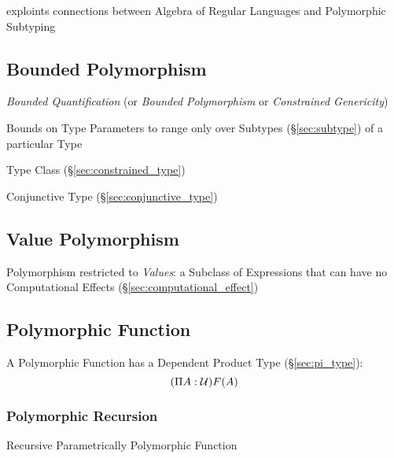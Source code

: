 exploints connections between Algebra of Regular Languages and
Polymorphic Subtyping



\subsection{Bounded Polymorphism}\label{sec:bounded_polymorphism}

\emph{Bounded Quantification} (or \emph{Bounded Polymorphism} or
\emph{Constrained Genericity})

Bounds on Type Parameters to range only over Subtypes
(\S\ref{sec:subtype}) of a particular Type

Type Class (\S\ref{sec:constrained_type})

Conjunctive Type (\S\ref{sec:conjunctive_type})



\subsection{Value Polymorphism}\label{sec:value_polymorphism}

Polymorphism restricted to \emph{Values}: a Subclass of Expressions
that can have no Computational Effects
(\S\ref{sec:computational_effect})



\subsection{Polymorphic Function}\label{sec:polymorphic_function}

A Polymorphic Function has a Dependent Product Type
(\S\ref{sec:pi_type}):
\[
  (\Pi A:\mathcal{U}) F(A)
\]



\subsubsection{Polymorphic Recursion}\label{sec:polymorphic_recursion}

Recursive Parametrically Polymorphic Function

